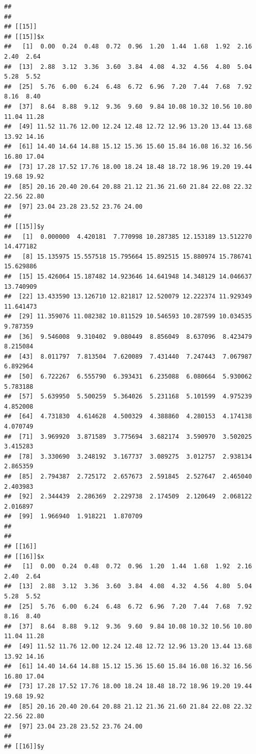 \documentclass[
  ignorenonframetext,
]{beamer}
\begin{document}
\begin{frame}[fragile]{}
\begin{verbatim}
## 
## 
## [[15]]
## [[15]]$x
##   [1]  0.00  0.24  0.48  0.72  0.96  1.20  1.44  1.68  1.92  2.16  2.40  2.64
##  [13]  2.88  3.12  3.36  3.60  3.84  4.08  4.32  4.56  4.80  5.04  5.28  5.52
##  [25]  5.76  6.00  6.24  6.48  6.72  6.96  7.20  7.44  7.68  7.92  8.16  8.40
##  [37]  8.64  8.88  9.12  9.36  9.60  9.84 10.08 10.32 10.56 10.80 11.04 11.28
##  [49] 11.52 11.76 12.00 12.24 12.48 12.72 12.96 13.20 13.44 13.68 13.92 14.16
##  [61] 14.40 14.64 14.88 15.12 15.36 15.60 15.84 16.08 16.32 16.56 16.80 17.04
##  [73] 17.28 17.52 17.76 18.00 18.24 18.48 18.72 18.96 19.20 19.44 19.68 19.92
##  [85] 20.16 20.40 20.64 20.88 21.12 21.36 21.60 21.84 22.08 22.32 22.56 22.80
##  [97] 23.04 23.28 23.52 23.76 24.00
## 
## [[15]]$y
##   [1]  0.000000  4.420181  7.770998 10.287385 12.153189 13.512270 14.477182
##   [8] 15.135975 15.557518 15.795664 15.892515 15.880974 15.786741 15.629886
##  [15] 15.426064 15.187482 14.923646 14.641948 14.348129 14.046637 13.740909
##  [22] 13.433590 13.126710 12.821817 12.520079 12.222374 11.929349 11.641473
##  [29] 11.359076 11.082382 10.811529 10.546593 10.287599 10.034535  9.787359
##  [36]  9.546008  9.310402  9.080449  8.856049  8.637096  8.423479  8.215084
##  [43]  8.011797  7.813504  7.620089  7.431440  7.247443  7.067987  6.892964
##  [50]  6.722267  6.555790  6.393431  6.235088  6.080664  5.930062  5.783188
##  [57]  5.639950  5.500259  5.364026  5.231168  5.101599  4.975239  4.852008
##  [64]  4.731830  4.614628  4.500329  4.388860  4.280153  4.174138  4.070749
##  [71]  3.969920  3.871589  3.775694  3.682174  3.590970  3.502025  3.415283
##  [78]  3.330690  3.248192  3.167737  3.089275  3.012757  2.938134  2.865359
##  [85]  2.794387  2.725172  2.657673  2.591845  2.527647  2.465040  2.403983
##  [92]  2.344439  2.286369  2.229738  2.174509  2.120649  2.068122  2.016897
##  [99]  1.966940  1.918221  1.870709
## 
## 
## [[16]]
## [[16]]$x
##   [1]  0.00  0.24  0.48  0.72  0.96  1.20  1.44  1.68  1.92  2.16  2.40  2.64
##  [13]  2.88  3.12  3.36  3.60  3.84  4.08  4.32  4.56  4.80  5.04  5.28  5.52
##  [25]  5.76  6.00  6.24  6.48  6.72  6.96  7.20  7.44  7.68  7.92  8.16  8.40
##  [37]  8.64  8.88  9.12  9.36  9.60  9.84 10.08 10.32 10.56 10.80 11.04 11.28
##  [49] 11.52 11.76 12.00 12.24 12.48 12.72 12.96 13.20 13.44 13.68 13.92 14.16
##  [61] 14.40 14.64 14.88 15.12 15.36 15.60 15.84 16.08 16.32 16.56 16.80 17.04
##  [73] 17.28 17.52 17.76 18.00 18.24 18.48 18.72 18.96 19.20 19.44 19.68 19.92
##  [85] 20.16 20.40 20.64 20.88 21.12 21.36 21.60 21.84 22.08 22.32 22.56 22.80
##  [97] 23.04 23.28 23.52 23.76 24.00
## 
## [[16]]$y

\end{verbatim}
\end{frame}
\end{document}
